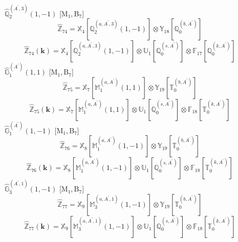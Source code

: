 \documentclass[fleqn,10pt,landscape]{article}
\begin{document}
\begin{itemize}
\noindent {} $\,\,\,\hat{\mathbb{Q}}_{2}^{(A^{\prime},3)}(1,-1)$ [M$_{1}$,\,B$_{7}$]
\begin{dmath*}
\hat{\mathbb{Z}}_{74}=\mathbb{X}_{4}[\mathbb{Q}_{2}^{(a,A^{\prime},3)}(1,-1)] \otimes\mathbb{Y}_{18}[\mathbb{Q}_{0}^{(b,A^{\prime})}]
\end{dmath*}
\begin{dmath*}
\hat{\mathbb{Z}}_{74}(\bm{k})=\mathbb{X}_{4}[\mathbb{Q}_{2}^{(a,A^{\prime},3)}(1,-1)] \otimes\mathbb{U}_{1}[\mathbb{Q}_{0}^{(s,A^{\prime})}] \otimes\mathbb{F}_{17}[\mathbb{Q}_{0}^{(k,A^{\prime})}]
\end{dmath*}
\vspace{4mm}
\noindent {} $\,\,\,\hat{\mathbb{G}}_{1}^{(A^{\prime})}(1,1)$ [M$_{1}$,\,B$_{7}$]
\begin{dmath*}
\hat{\mathbb{Z}}_{75}=\mathbb{X}_{7}[\mathbb{M}_{1}^{(a,A^{\prime})}(1,1)] \otimes\mathbb{Y}_{19}[\mathbb{T}_{0}^{(b,A^{\prime})}]
\end{dmath*}
\begin{dmath*}
\hat{\mathbb{Z}}_{75}(\bm{k})=\mathbb{X}_{7}[\mathbb{M}_{1}^{(a,A^{\prime})}(1,1)] \otimes\mathbb{U}_{1}[\mathbb{Q}_{0}^{(s,A^{\prime})}] \otimes\mathbb{F}_{18}[\mathbb{T}_{0}^{(k,A^{\prime})}]
\end{dmath*}
\vspace{4mm}
\noindent {} $\,\,\,\hat{\mathbb{G}}_{1}^{(A^{\prime})}(1,-1)$ [M$_{1}$,\,B$_{7}$]
\begin{dmath*}
\hat{\mathbb{Z}}_{76}=\mathbb{X}_{8}[\mathbb{M}_{1}^{(a,A^{\prime})}(1,-1)] \otimes\mathbb{Y}_{19}[\mathbb{T}_{0}^{(b,A^{\prime})}]
\end{dmath*}
\begin{dmath*}
\hat{\mathbb{Z}}_{76}(\bm{k})=\mathbb{X}_{8}[\mathbb{M}_{1}^{(a,A^{\prime})}(1,-1)] \otimes\mathbb{U}_{1}[\mathbb{Q}_{0}^{(s,A^{\prime})}] \otimes\mathbb{F}_{18}[\mathbb{T}_{0}^{(k,A^{\prime})}]
\end{dmath*}
\vspace{4mm}
\noindent {} $\,\,\,\hat{\mathbb{G}}_{3}^{(A^{\prime},1)}(1,-1)$ [M$_{1}$,\,B$_{7}$]
\begin{dmath*}
\hat{\mathbb{Z}}_{77}=\mathbb{X}_{9}[\mathbb{M}_{3}^{(a,A^{\prime},1)}(1,-1)] \otimes\mathbb{Y}_{19}[\mathbb{T}_{0}^{(b,A^{\prime})}]
\end{dmath*}
\begin{dmath*}
\hat{\mathbb{Z}}_{77}(\bm{k})=\mathbb{X}_{9}[\mathbb{M}_{3}^{(a,A^{\prime},1)}(1,-1)] \otimes\mathbb{U}_{1}[\mathbb{Q}_{0}^{(s,A^{\prime})}] \otimes\mathbb{F}_{18}[\mathbb{T}_{0}^{(k,A^{\prime})}]

\end{dmath*}
\end{itemize}
\end{document}
